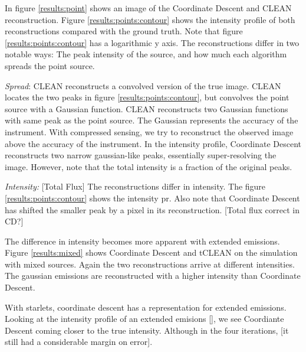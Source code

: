 In figure \ref{results:point} shows an image of the Coordinate Descent and CLEAN reconstruction. Figure \ref{results:points:contour} shows the intensity profile of both reconstructions compared with the ground truth. Note that figure \ref{results:points:contour} has a logarithmic y axis. The reconstructions differ in two notable ways: The peak intensity of the source, and how much each algorithm spreads the point source. 

\textit{Spread}: CLEAN reconstructs a convolved version of the true image. CLEAN locates the two peaks in figure \ref{results:points:contour}, but convolves the point source with a Gaussian function. CLEAN reconstructs two Gaussian functions with same peak as the point source. The Gaussian represents the accuracy of the instrument. With compressed sensing, we try to reconstruct the observed image above the accuracy of the instrument. In the intensity profile, Coordinate Descent reconstructs two narrow gaussian-like peaks, essentially super-resolving the image. However, note that the total intensity is a fraction of the original peaks.

\textit{Intensity:} [Total Flux] The reconstructions differ in intensity. The figure \ref{results:points:contour} shows the intensity pr. Also note that Coordinate Descent has shifted the smaller peak by a pixel in its reconstruction. [Total flux correct in CD?]



The difference in intensity becomes more apparent with extended emissions. Figure \ref{results:mixed} shows Coordinate Descent and tCLEAN on the simulation with mixed sources. Again the two reconstructions arrive at different intensities. The gaussian emissions are reconstructed with a higher intensity than Coordinate Descent.






With starlets, coordinate descent has a representation for extended emissions. Looking at the intensity profile of an extended emisions \ref{}, we see Coordiante Descent coming closer to the true intensity. Although in the four iterations,  [it still had a considerable margin on error]. 



